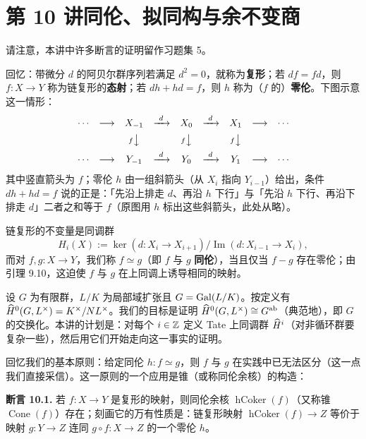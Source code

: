 \section*{第 10 讲\quad 同伦、拟同构与余不变商}

请注意，本讲中许多断言的证明留作习题集 5。

回忆：带微分 $d$ 的阿贝尔群序列若满足 $d^2=0$，就称为\textbf{复形}；若 $df=fd$，则 $f\colon X\to Y$ 称为链复形的\textbf{态射}；若 $dh+hd=f$，则 $h$ 称为（$f$ 的）\textbf{零伦}。下图示意这一情形：
\[
\begin{array}{ccccccccc}
\cdots & \longrightarrow & X_{-1} & \xrightarrow{\ d\ } & X_0 & \xrightarrow{\ d\ } & X_1 & \longrightarrow & \cdots\\[5pt]
& & {\scriptstyle f}\big\downarrow & & {\scriptstyle f}\big\downarrow & & {\scriptstyle f}\big\downarrow & & \\[5pt]
\cdots & \longrightarrow & Y_{-1} & \xrightarrow{\ d\ } & Y_0 & \xrightarrow{\ d\ } & Y_1 & \longrightarrow & \cdots
\end{array}
\]
其中竖直箭头为 $f$；零伦 $h$ 由一组斜箭头（从 $X_i$ 指向 $Y_{i-1}$）给出，条件 $dh+hd=f$ 说的正是：「先沿上排走 $d$、再沿 $h$ 下行」与「先沿 $h$ 下行、再沿下排走 $d$」二者之和等于 $f$（原图用 $h$ 标出这些斜箭头，此处从略）。

链复形的不变量是同调群
\[
H_i(X):=\ker(d\colon X_i\to X_{i+1})/\operatorname{Im}(d\colon X_{i-1}\to X_i),
\]
而对 $f,g\colon X\to Y$，我们称 $f\simeq g$（即 $f$ 与 $g$ \textbf{同伦}），当且仅当 $f-g$ 存在零伦；由引理 9.10，这迫使 $f$ 与 $g$ 在上同调上诱导相同的映射。

设 $G$ 为有限群，$L/K$ 为局部域扩张且 $G=\operatorname{Gal}(L/K)$。按定义有 $\widehat{H}^0(G,L^\times)=K^\times/NL^\times$。我们的目标是证明 $\widehat{H}^0(G,L^\times)\cong G^{\mathrm{ab}}$（典范地），即 $G$ 的交换化。本讲的计划是：对每个 $i\in\mathbb{Z}$ 定义 Tate 上同调群 $\widehat{H}^i$（对非循环群要复杂一些），然后用它们开始走向这一事实的证明。

回忆我们的基本原则：给定同伦 $h\colon f\simeq g$，则 $f$ 与 $g$ 在实践中已无法区分（这一点我们直接采信）。这一原则的一个应用是锥（或称同伦余核）的构造：

\textbf{断言 10.1.} 若 $f\colon X\to Y$ 是复形的映射，则同伦余核 $\operatorname{hCoker}(f)$（又称锥 $\operatorname{Cone}(f)$）存在；刻画它的万有性质是：链复形映射 $\operatorname{hCoker}(f)\to Z$ 等价于映射 $g\colon Y\to Z$ 连同 $g\circ f\colon X\to Z$ 的一个零伦 $h$。

